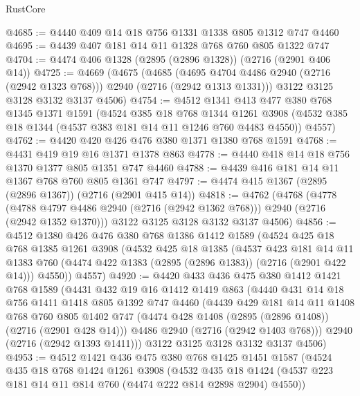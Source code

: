 \begin{lexlean}{RustCore}
\begin{coremodule}
@4685 := @4440 @409 @14 @18 @756 @1331 @1338 @805 @1312 @747 @4460
@4695 := @4439 @407 @181 @14 @11 @1328 @768 @760 @805 @1322 @747
@4704 := @4474 @406 @1328 (@2895 (@2896 @1328)) (@2716 (@2901 @406 @14))
@4725 := @4669
    (@4675
      (@4685 (@4695 @4704 @4486 @2940 (@2716 (@2942 @1323 @768))) @2940 (@2716 (@2942 @1313 @1331)))
      @3122
      @3125
      @3128
      @3132
      @3137
      @4506)
@4754 := @4512
    @1341
    @413
    @477
    @380
    @768
    @1345
    @1371
    @1591
    (@4524
      @385
      @18
      @768
      @1344
      @1261
      @3908
      (@4532 @385 @18 @1344 (@4537 @383 @181 @14 @11 @1246 @760 @4483 @4550))
      @4557)
@4762 := @4420 @420 @426 @476 @380 @1371 @1380 @768 @1591
@4768 := @4431 @419 @19 @16 @1371 @1378 @863
@4778 := @4440 @418 @14 @18 @756 @1370 @1377 @805 @1351 @747 @4460
@4788 := @4439 @416 @181 @14 @11 @1367 @768 @760 @805 @1361 @747
@4797 := @4474 @415 @1367 (@2895 (@2896 @1367)) (@2716 (@2901 @415 @14))
@4818 := @4762
    (@4768
      (@4778 (@4788 @4797 @4486 @2940 (@2716 (@2942 @1362 @768))) @2940 (@2716 (@2942 @1352 @1370)))
      @3122
      @3125
      @3128
      @3132
      @3137
      @4506)
@4856 := @4512
    @1380
    @426
    @476
    @380
    @768
    @1386
    @1412
    @1589
    (@4524
      @425
      @18
      @768
      @1385
      @1261
      @3908
      (@4532
        @425
        @18
        @1385
        (@4537
          @423
          @181
          @14
          @11
          @1383
          @760
          (@4474 @422 @1383 (@2895 (@2896 @1383)) (@2716 (@2901 @422 @14)))
          @4550))
      @4557)
@4920 := @4420
    @433
    @436
    @475
    @380
    @1412
    @1421
    @768
    @1589
    (@4431
      @432
      @19
      @16
      @1412
      @1419
      @863
      (@4440
        @431
        @14
        @18
        @756
        @1411
        @1418
        @805
        @1392
        @747
        @4460
        (@4439
          @429
          @181
          @14
          @11
          @1408
          @768
          @760
          @805
          @1402
          @747
          (@4474 @428 @1408 (@2895 (@2896 @1408)) (@2716 (@2901 @428 @14)))
          @4486
          @2940
          (@2716 (@2942 @1403 @768)))
        @2940
        (@2716 (@2942 @1393 @1411)))
      @3122
      @3125
      @3128
      @3132
      @3137
      @4506)
@4953 := @4512
    @1421
    @436
    @475
    @380
    @768
    @1425
    @1451
    @1587
    (@4524
      @435
      @18
      @768
      @1424
      @1261
      @3908
      (@4532 @435 @18 @1424 (@4537 @223 @181 @14 @11 @814 @760 (@4474 @222 @814 @2898 @2904) @4550))

\end{coremodule}
\end{lexlean}
